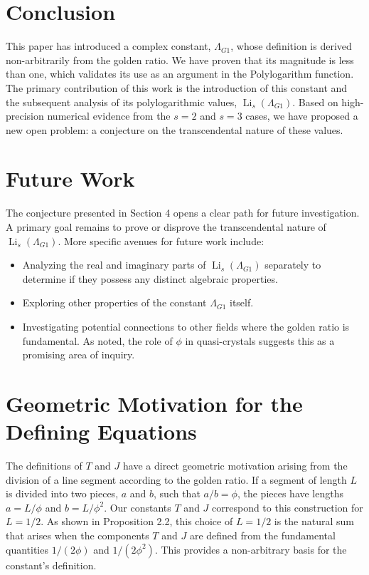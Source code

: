 \documentclass{amsart}
\theoremstyle{plain}
\theoremstyle{definition}
\theoremstyle{remark}
\DeclareMathOperator{\Li}{Li} %
\newcommand{\LambdaG}{\Lambda_{G1}}
\begin{document}
\section{Conclusion}
This paper has introduced a complex constant, $\LambdaG$, whose definition is derived non-arbitrarily from the golden ratio.
We have proven that its magnitude is less than one, which validates its use as an argument in the Polylogarithm function.
The primary contribution of this work is the introduction of this constant and the subsequent analysis of its polylogarithmic values, $\Li_s(\LambdaG)$.
Based on high-precision numerical evidence from the $s=2$ and $s=3$ cases, we have proposed a new open problem: a conjecture on the transcendental nature of these values.

\section{Future Work}
The conjecture presented in Section 4 opens a clear path for future investigation.
A primary goal remains to prove or disprove the transcendental nature of $\Li_s(\LambdaG)$.
More specific avenues for future work include:
\begin{itemize}
    \item Analyzing the real and imaginary parts of $\Li_s(\LambdaG)$ separately to determine if they possess any distinct algebraic properties.
    \item Exploring other properties of the constant $\LambdaG$ itself.
    \item Investigating potential connections to other fields where the golden ratio is fundamental. As noted, the role of $\phi$ in quasi-crystals suggests this as a promising area of inquiry.
\end{itemize}

\appendix
\section{Geometric Motivation for the Defining Equations}
\label{app:A}
The definitions of $T$ and $J$ have a direct geometric motivation arising from the division of a line segment according to the golden ratio.
If a segment of length $L$ is divided into two pieces, $a$ and $b$, such that $a/b = \phi$, the pieces have lengths $a=L/\phi$ and $b=L/\phi^2$.
Our constants $T$ and $J$ correspond to this construction for $L=1/2$.
As shown in Proposition 2.2, this choice of $L=1/2$ is the natural sum that arises when the components $T$ and $J$ are defined from the fundamental quantities $1/(2\phi)$ and $1/(2\phi^2)$.
This provides a non-arbitrary basis for the constant's definition.
\end{document}
